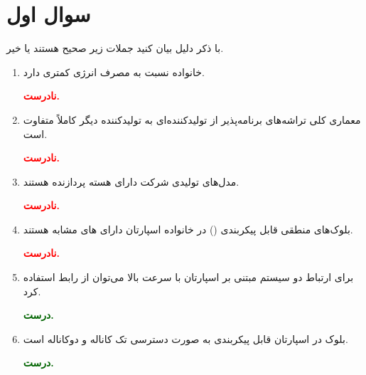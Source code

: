 \section{سوال اول}

با ذکر دلیل بیان کنید جملات زیر صحیح هستند یا خیر.

\begin{enumerate}
	\item 
	خانواده  نسبت به  مصرف انرژی کمتری دارد.
	\begin{qsolve}
		\textbf{\textcolor{red}{نادرست.}}\\
		
	\end{qsolve}
	
	
	
	\item 
	معماری کلی تراشه‌های برنامه‌پذیر از تولیدکننده‌ای به تولیدکننده دیگر کاملاً متفاوت است.
	\begin{qsolve}
		\textbf{\textcolor{red}{نادرست.}}\\
		
	\end{qsolve}
	
	
	
	\item 
	مدل‌های  تولیدی شرکت  دارای هسته پردازنده  هستند.
	\begin{qsolve}
		\textbf{\textcolor{red}{نادرست.}}\\
		
	\end{qsolve}
	
	
	
	\item 
	بلوک‌های منطقی قابل پیکربندی () در خانواده اسپارتان دارای های مشابه هستند.
	\begin{qsolve}
		\textbf{\textcolor{red}{نادرست.}}\\

	\end{qsolve}
	
	\item 
	برای ارتباط دو سیستم مبتنی بر اسپارتان  با سرعت بالا می‌توان از رابط  استفاده کرد.
	\begin{qsolve}
		\textbf{\textcolor{darkgreen}{درست.}}\\
		
	\end{qsolve}
	
	
	
	
	\item 
بلوک  در اسپارتان قابل پیکربندی به صورت دسترسی تک کاناله و دوکاناله است.
	\begin{qsolve}
		\textbf{\textcolor{darkgreen}{درست.}}\\
		

\end{qsolve}
\end{enumerate}
